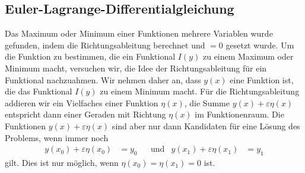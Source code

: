 %
%
\subsection{Euler-Lagrange-Differentialgleichung}
Das Maximum oder Minimum einer Funktionen mehrere Variablen wurde
gefunden, indem die Richtungsableitung berechnet und $=0$ gesetzt
wurde.
Um die Funktion zu bestimmen, die ein Funktional $I(y)$ zu einem
Maximum oder Minimum macht, versuchen wir, die Idee der Richtungsableitung
für ein Funktional nachzuahmen.
Wir nehmen daher an, dass $y(x)$ eine Funktion ist, die das Funktional
$I(y)$ zu einem Minimum macht.
Für die Richtungsableitung addieren wir ein Vielfaches einer
Funktion $\eta(x)$, die Summe $y(x)+\varepsilon\eta(x)$ entspricht
dann einer Geraden mit Richtung $\eta(x)$ im Funktionenraum.
Die Funktionen $y(x)+\varepsilon\eta(x)$ sind aber nur dann Kandidaten
für eine Lösung des Problems, wenn immer noch
\begin{align*}
y(x_0) + \varepsilon \eta(x_0) &= y_0
&&\text{und}&
y(x_1) + \varepsilon \eta(x_1) &= y_1
\end{align*}
gilt.
Dies ist nur möglich, wenn $\eta(x_0)=\eta(x_1)=0$ ist.

